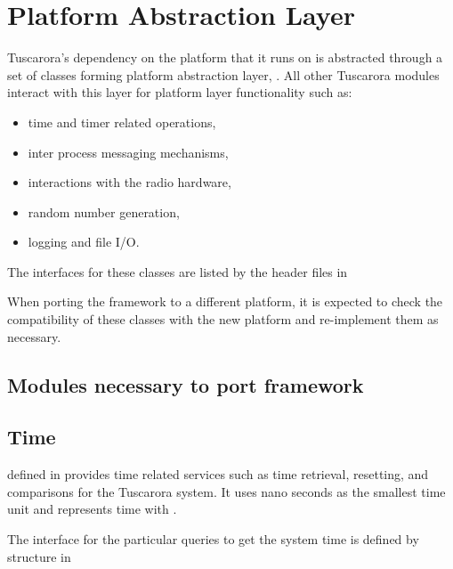 \section{Platform Abstraction Layer}

Tuscarora's dependency on the platform that it runs on  is abstracted through a set of classes forming platform abstraction layer, . 
All other Tuscarora modules interact with this layer for platform layer functionality such as:

\begin{itemize}
	\item time and timer related operations,
	\item inter process messaging mechanisms,
	\item interactions with the radio hardware,
	\item random number generation,
	\item logging and file I/O.
\end{itemize} 

The interfaces for these classes are listed by the header files in 

When porting the framework to a different platform, it is expected to check the compatibility of these classes with the new platform and re-implement them as necessary. 


\subsection{Modules necessary to port framework}

\subsection{Time}

 defined in  provides time related services such as time retrieval, resetting, and comparisons for the Tuscarora system. It uses nano seconds as the smallest time unit and represents time with . 

The interface for the particular queries to get the system time is defined by  structure in 

%
%	
%	
%	

